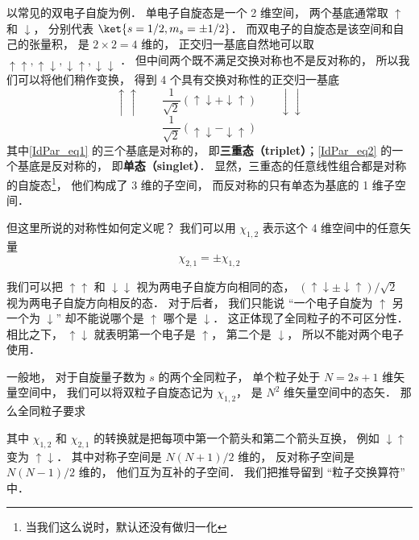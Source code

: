 \begin{example}{}\label{IdPar_ex1}
以常见的双电子自旋为例． 单电子自旋态是一个 2 维空间， 两个基底通常取 $\uparrow$ 和 $\downarrow$， 分别代表 $\ket{s=1/2,m_s=\pm 1/2}$． 而双电子的自旋态是该空间和自己的张量积， 是 $2\times2 = 4$ 维的， 正交归一基底自然地可以取 $\uparrow\uparrow, \uparrow\downarrow, \downarrow\uparrow, \downarrow\downarrow$ ． 但中间两个既不满足交换对称也不是反对称的， 所以我们可以将他们稍作变换， 得到 4 个具有交换对称性的正交归一基底
\begin{equation}\label{IdPar_eq1}
\uparrow\uparrow \qquad \frac{1}{\sqrt 2}(\uparrow\downarrow + \downarrow\uparrow) \qquad \downarrow\downarrow
\end{equation}
\begin{equation}\label{IdPar_eq2}
\frac{1}{\sqrt 2}(\uparrow\downarrow - \downarrow\uparrow)
\end{equation}
其中\autoref{IdPar_eq1} 的三个基底是对称的， 即\textbf{三重态（triplet）}；\autoref{IdPar_eq2} 的一个基底是反对称的， 即\textbf{单态（singlet）}． %
显然，三重态的任意线性组合都是对称的自旋态\footnote{当我们这么说时，默认还没有做归一化}， 他们构成了 3 维的子空间， 而反对称的只有单态为基底的 1 维子空间．

但这里所说的对称性如何定义呢？ 我们可以用 $\chi_{1,2}$ 表示这个 4 维空间中的任意矢量
\begin{equation}\label{IdPar_eq3}
\chi_{2,1} = \pm\chi_{1,2}
\end{equation}

我们可以把 $\uparrow\uparrow$ 和 $\downarrow\downarrow$ 视为两电子自旋方向相同的态， $(\uparrow\downarrow \pm \downarrow\uparrow)/\sqrt{2}$ 视为两电子自旋方向相反的态． 对于后者， 我们只能说 “一个电子自旋为 $\uparrow$ 另一个为 $\downarrow$” 却不能说哪个是 $\uparrow$ 哪个是 $\downarrow$． 这正体现了全同粒子的不可区分性． 相比之下， $\uparrow\downarrow$ 就表明第一个电子是 $\uparrow$， 第二个是 $\downarrow$， 所以不能对两个电子使用．
\end{example}

一般地， 对于自旋量子数为 $s$ 的两个全同粒子， 单个粒子处于 $N = 2s+1$ 维矢量空间中， 我们可以将双粒子自旋态记为 $\chi_{1,2}$， 是 $N^2$ 维矢量空间中的态矢． 那么全同粒子要求

其中 $\chi_{1,2}$ 和 $\chi_{2,1}$ 的转换就是把每项中第一个箭头和第二个箭头互换， 例如 $\downarrow\uparrow$ 变为 $\uparrow\downarrow$． 其中对称子空间是 $N(N+1)/2$ 维的， 反对称子空间是 $N(N-1)/2$ 维的， 他们互为互补的子空间． 我们把推导留到 “粒子交换算符” 中．

